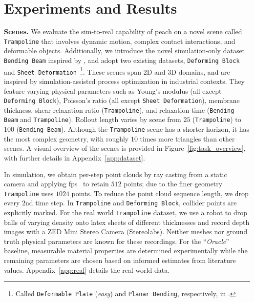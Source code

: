 \section{Experiments and Results}
\label{sec:experiments}


\textbf{Scenes.}
We evaluate the sim-to-real capability of \gls{peach} on a novel scene called \texttt{Trampoline} that involves dynamic motion, complex contact interactions, and deformable objects.
Additionally, we introduce the novel simulation-only dataset \texttt{Bending Beam} inspired by \citet{wurth2025diffusion}, and adopt two existing datasets, \texttt{Deforming Block} and \texttt{Sheet Deformation}~\citep{dahlinger2025mango}\footnote{Called \texttt{Deformable Plate} (\textit{easy}) and \texttt{Planar Bending}, respectively, in \citet{dahlinger2025mango}.}.
These scenes span 2D and 3D domains, and are inspired by simulation-assisted process optimization in industrial contexts.
They feature varying physical parameters such as Young's modulus (all except \texttt{Deforming Block}), Poisson's ratio (all except \texttt{Sheet Deformation}), membrane thickness, shear relaxation ratio (\texttt{Trampoline}), and relaxation time (\texttt{Bending Beam} and \texttt{Trampoline}).
Rollout length varies by scene from $25$ (\texttt{Trampoline}) to $100$ (\texttt{Bending Beam}).
Although the \texttt{Trampoline} scene has a shorter horizon, it has the most complex geometry, with roughly $10$ times more triangles than other scenes.
A visual overview of the scenes is provided in Figure~\ref{fig:task_overview}, with further details in Appendix~\ref{app:dataset}.

In simulation, we obtain per-step point clouds by ray casting from a static camera and applying \gls{fps}~\citep{ruizhongtai2017pointnet} to retain $512$ points; due to the finer geometry \texttt{Trampoline} uses $1024$ points.
To reduce the point cloud sequence length, we drop every $2$nd time step. 
In \texttt{Trampoline} and \texttt{Deforming Block}, collider points are explicitly marked.
For the real world \texttt{Trampoline} dataset, we use a robot to drop balls of varying density onto latex sheets of different thicknesses and record depth images with a ZED Mini Stereo Camera (Stereolabs).
Neither meshes nor ground truth physical parameters are known for these recordings.
For the ``\textit{Oracle}'' baseline, measurable material properties are determined experimentally  while the remaining parameters are chosen based on informed estimates from literature values.
Appendix~\ref{app:real} details the real-world data.

